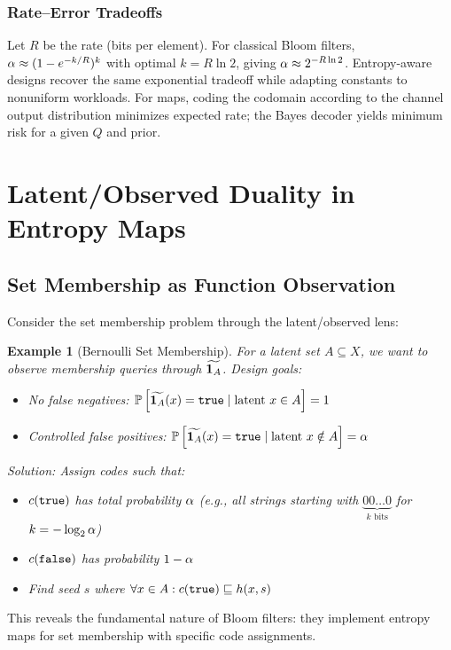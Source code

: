 \documentclass[11pt,final,hidelinks]{article}
\newtheorem{example}[theorem]{Example}
\begin{document}
\subsubsection{Rate–Error Tradeoffs}
Let $R$ be the rate (bits per element). For classical Bloom filters, $\alpha \approx (1-e^{-k/R})^k$ with optimal $k=R\ln 2$, giving $\alpha\approx 2^{-R\ln 2}$. Entropy-aware designs recover the same exponential tradeoff while adapting constants to nonuniform workloads. For maps, coding the codomain according to the channel output distribution minimizes expected rate; the Bayes decoder yields minimum risk for a given $Q$ and prior.

\section{Latent/Observed Duality in Entropy Maps}

\subsection{Set Membership as Function Observation}

Consider the set membership problem through the latent/observed lens:

\begin{example}[Bernoulli Set Membership]
For a latent set $A \subseteq X$, we want to observe membership queries through $\widetilde{\mathbf{1}_{A}}$. Design goals:
\begin{itemize}
    \item No false negatives: $\mathbb{P}\left[\widetilde{\mathbf{1}_{A}}(x) = \mathtt{true} \mid \text{latent } x \in A\right] = 1$
    \item Controlled false positives: $\mathbb{P}\left[\widetilde{\mathbf{1}_{A}}(x) = \mathtt{true} \mid \text{latent } x \notin A\right] = \alpha$
\end{itemize}

Solution: Assign codes such that:
\begin{itemize}
    \item $c(\mathtt{true})$ has total probability $\alpha$ (e.g., all strings starting with $\underbrace{00\ldots0}_{k \text{ bits}}$ for $k = -\log_2 \alpha$)
    \item $c(\mathtt{false})$ has probability $1 - \alpha$
    \item Find seed $s$ where $\forall x \in A: c(\mathtt{true}) \sqsubseteq h(x, s)$
\end{itemize}
\end{example}

This reveals the fundamental nature of Bloom filters: they implement entropy maps for set membership with specific code assignments.
\end{document}

